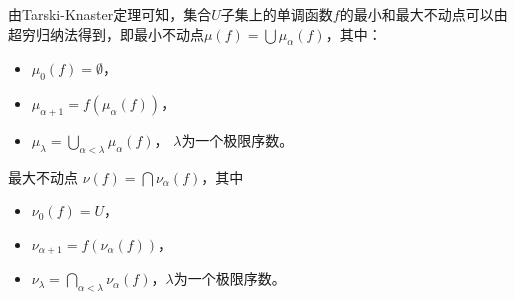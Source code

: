 由Tarski-Knaster定理可知，集合$U$子集上的单调函数$f$的最小和最大不动点可以由超穷归纳法得到，即最小不动点$\mu(f)= \bigcup\mu_{\alpha}(f)$，其中：
\begin{itemize}
	\item $\mu_0(f) = \emptyset$，
	\item $\mu_{\alpha+1} =  f(\mu_{\alpha}(f))$，
	\item $\mu_{\lambda} = \bigcup_{\alpha < \lambda} \mu_{\alpha}(f)$， $\lambda$为一个极限序数。
\end{itemize}
最大不动点 $\nu(f) = \bigcap\nu_{\alpha}(f)$，其中
\begin{itemize}
	\item $\nu_0(f) = U$，
	\item $\nu_{\alpha+1} =  f(\nu_{\alpha}(f))$，
	\item $\nu_{\lambda} = \bigcap_{\alpha < \lambda} \nu_{\alpha}(f)$，$\lambda$为一个极限序数。
\end{itemize}


